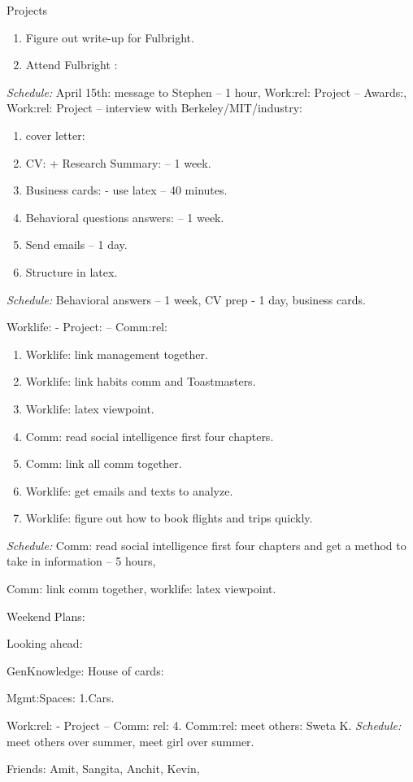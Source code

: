 \documentclass[serif, mathserif, final]{beamer}
\begin{document}
\begin{frame}
\begin{columns}
\begin{block}{Projects}
\begin{enumerate} 
\tiny \item \tiny Figure out write-up for Fulbright.
\item \tiny Attend Fulbright : 
\end{enumerate} 
\textit{Schedule:} April 15th: message to Stephen – 1 hour, Work:rel:
Project – Awards:,  Work:rel: Project – interview with
Berkeley/MIT/industry: 

\begin{enumerate}
\tiny \item \tiny cover letter:
\tiny \item \tiny CV: + Research Summary:  -- 1 week.  
\item \tiny Business cards:  - use latex  -- 40 minutes. 
\item \tiny Behavioral questions answers:    -- 1 week. 
\item \tiny Send emails – 1 day. 
\item \tiny Structure in latex. 
\end{enumerate}

\textit{Schedule:} Behavioral answers – 1 week, CV prep - 1 day, business cards.

Worklife: - Project: – Comm:rel: 



\begin{enumerate} 
\tiny \item \tiny Worklife: link management together. 
\item \tiny  Worklife: link habits comm and Toastmasters.
\item \tiny Worklife: latex viewpoint. 
\item \tiny Comm: read social intelligence first four chapters.
\item \tiny  Comm: link all comm together.
\item \tiny Worklife: get emails and texts to analyze. 
\item \tiny  Worklife: figure out how to book flights and trips quickly. 
\end{enumerate}
\textit{Schedule:}  Comm: read social intelligence first four chapters and get a
method to take in information – 5 hours, 

Comm: link comm together, worklife: latex viewpoint.

Weekend Plans: 

Looking ahead: 

GenKnowledge: 
House of cards: 

Mgmt:Spaces: 
1.Cars. 

Work:rel: -  Project – Comm: rel: 
4. Comm:rel: meet others:  Sweta K. 
{\it Schedule:} meet others over summer, meet girl over summer. 

Friends: Amit, Sangita, Anchit, Kevin, 

\end{block}

\end{columns}
\end{frame}  
\end{document}

